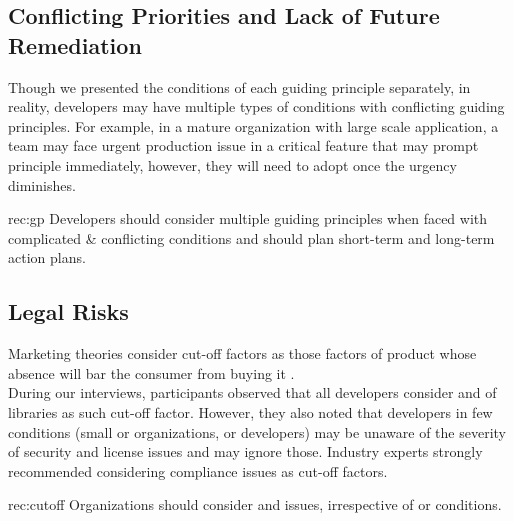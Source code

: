 \subsection{Conflicting Priorities and Lack of Future Remediation}
Though we presented the conditions of each guiding principle separately, in reality, developers may have multiple types of conditions with conflicting guiding principles. For example, in a mature organization with large scale application, a team may face urgent production issue in a critical feature that may prompt  principle immediately, however, they will need to adopt  once the urgency diminishes. %
\begin{recommendation}{rec:gp}
Developers should consider multiple guiding principles when faced with complicated \& conflicting conditions and should plan short-term and long-term action plans. 
\end{recommendation}\medskip

\subsection{Legal Risks}
Marketing theories consider cut-off factors as those factors of product whose absence will bar the consumer from buying it \cite{blackwell2001consumer}. \\%
During our interviews, participants observed that all developers consider  and  of libraries as such cut-off factor. However, they also noted that developers in few conditions (small or  organizations, or  developers) may be unaware of the severity of security and license issues and may ignore those. Industry experts strongly recommended  considering compliance issues as cut-off factors.
 \begin{recommendation}{rec:cutoff}
Organizations should consider  and  issues, irrespective of  or  conditions.
\end{recommendation}\medskip

